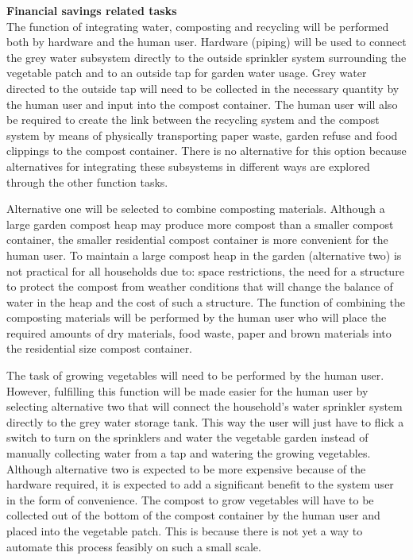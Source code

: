 \documentclass[a4paper,11pt,fleqn]{report}
\begin{document}
{\textbf{Financial savings related tasks}\\
The function of integrating water, composting and recycling will be performed both by hardware and the human user. Hardware (piping) will be used to connect the grey water subsystem directly to the outside sprinkler system surrounding the vegetable patch and to an outside tap for garden water usage. Grey water directed to the outside tap will need to be collected in the necessary quantity by the human user and input into the compost container. The human user will also be required to create the link between the recycling system and the compost system by means of physically transporting paper waste, garden refuse and food clippings to the compost container. There is no alternative for this option because alternatives for integrating these subsystems in different ways are explored through the other function tasks.

Alternative one will be selected to combine composting materials. Although a large garden compost heap may produce more compost than a smaller compost container, the smaller residential compost container is more convenient for the human user. To maintain a large compost heap in the garden (alternative two) is not practical for all households due to: space restrictions, the need for a structure to protect the compost from weather conditions that will change the balance of water in the heap and the cost of such a structure. The function of combining the composting materials will be performed by the human user who will place the required amounts of dry materials, food waste, paper and brown materials into the residential size compost container.

The task of growing vegetables will need to be performed by the human user. However, fulfilling this function will be made easier for the human user by selecting alternative two that will connect the household's water sprinkler system directly to the grey water storage tank. This way the user will just have to flick a switch to turn on the sprinklers and water the vegetable garden instead of manually collecting water from a tap and watering the growing vegetables. Although alternative two is expected to be more expensive because of the hardware required, it is expected to add a significant benefit to the system user in the form of convenience. The compost to grow vegetables will have to be collected out of the bottom of the compost container by the human user and placed into the vegetable patch. This is because there is not yet a way to automate this process feasibly on such a small scale.

}
\end{document}
